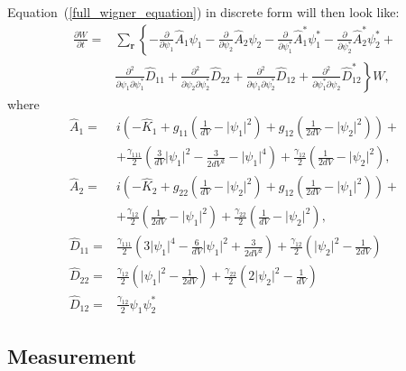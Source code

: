 \documentclass[12pt,notitlepage]{report}
\begin{document}
Equation~(\ref{full_wigner_equation}) in discrete form will then look like:
\begin{equation*}
\begin{split}
\frac{\partial W}{\partial t} = & \sum\limits_{\mathbf{r}} \left\{
	- \frac{\partial}{\partial \psi_1} \hat{A}_1 \psi_1 -
	\frac{\partial}{\partial \psi_2} \hat{A}_2 \psi_2 -
	\frac{\partial}{\partial \psi^*_1} \hat{A}^*_1 \psi^*_1 -
	\frac{\partial}{\partial \psi^*_2} \hat{A}^*_2 \psi^*_2 +
\right. \\
& \left.
	\frac{\partial^2}{\partial \psi_1 \partial \psi_1^*} \hat{D}_{11} +
	\frac{\partial^2}{\partial \psi_2 \partial \psi_2^*} \hat{D}_{22} +
	\frac{\partial^2}{\partial \psi_1 \partial \psi_2^*} \hat{D}_{12} +
	\frac{\partial^2}{\partial \psi_1^* \partial \psi_2} \hat{D}^*_{12}
\right\} W,
\end{split}
\end{equation*}
where
\begin{align*}
\hat{A}_1 = {} & i \left( - \hat{K}_1 + g_{11} \left( \frac{1}{dV} - \lvert \psi_1 \rvert^2 \right) +
g_{12} \left( \frac{1}{2 dV} - \lvert \psi_2 \rvert^2 \right) \right) + \\
& +\frac{\gamma_{111}}{2} \left( \frac{3}{dV} \lvert \psi_1 \rvert^2 - \frac{3}{2 dV^2} - \lvert \psi_1 \rvert^4 \right) +
\frac{\gamma_{12}}{2} \left( \frac{1}{2 dV} - \lvert \psi_2 \rvert^2 \right), \\
\hat{A}_2 = {} & i \left( - \hat{K}_2 + g_{22} \left( \frac{1}{dV} - \lvert \psi_2 \rvert^2 \right) +
g_{12} \left( \frac{1}{2 dV} - \lvert \psi_1 \rvert^2 \right) \right) + \\
& + \frac{\gamma_{12}}{2} \left( \frac{1}{2 dV} - \lvert \psi_1 \rvert^2 \right) +
\frac{\gamma_{22}}{2} \left( \frac{1}{dV} - \lvert \psi_2 \rvert^2 \right), \\
\hat{D}_{11} = {} & \frac{\gamma_{111}}{2} \left(3 \lvert \psi_1 \rvert^4 -
\frac{6}{dV} \lvert \psi_1 \rvert^2 + \frac{3}{2 dV^2} \right) + \frac{\gamma_{12}}{2} \left( \lvert \psi_2 \rvert^2 - \frac{1}{2 dV} \right) \\
\hat{D}_{22} = {} & \frac{\gamma_{12}}{2} \left( \lvert \psi_1 \rvert^2 - \frac{1}{2 dV} \right) +
\frac{\gamma_{22}}{2} \left( 2 \lvert \psi_2 \rvert^2 - \frac{1}{dV} \right) \\
\hat{D}_{12} = {} & \frac{\gamma_{12}}{2} \psi_1 \psi_2^*
\end{align*}

\subsection*{Measurement}
\end{document}
